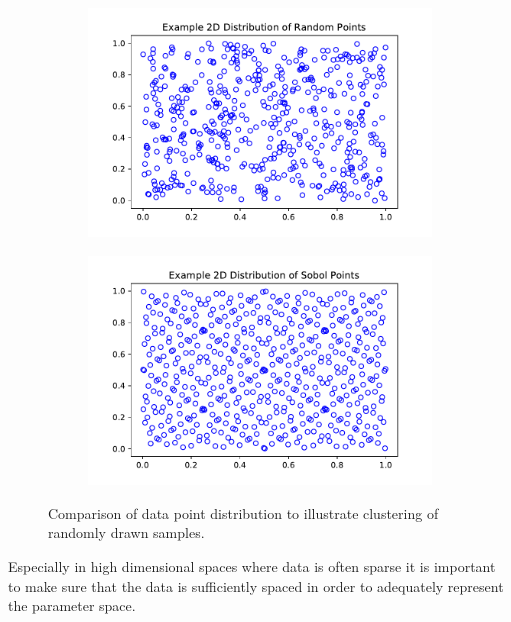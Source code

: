 		\begin{figure}
			\centering
			\begin{subfigure}{.48\textwidth}
				\centering
				\includegraphics[width=\textwidth]{images/2D_Dist_Rand512.pdf}
				\label{Fig:DistRand}
			\end{subfigure}
			\begin{subfigure}{.48\textwidth}
				\centering
				\includegraphics[width=\textwidth]{images/2D_Dist_Sobol512.pdf}
				\label{Fig:DistSobol}
			\end{subfigure}
			\caption{Comparison of data point distribution to illustrate clustering of randomly drawn samples.}
			\label{Fig:512Dist}
		\end{figure}
		Especially in high dimensional spaces where data is often sparse it is important to make sure that the data is sufficiently spaced in order to adequately represent the parameter space.